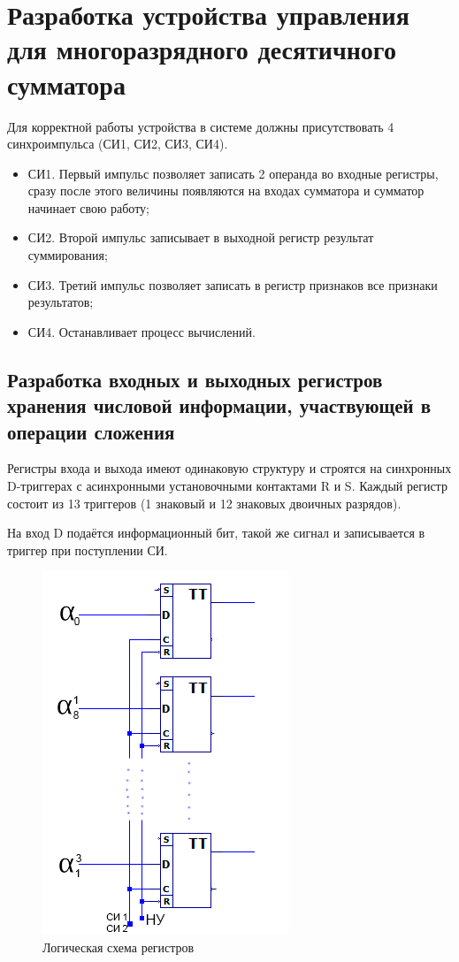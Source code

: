 \documentclass[a4paper,14pt]{article}
\begin{document}
\section{Разработка устройства управления для многоразрядного десятичного сумматора}

Для корректной работы устройства в системе должны присутствовать 4 синхроимпульса (СИ1, СИ2, СИ3, СИ4).

\begin{itemize}
	\item СИ1. Первый импульс позволяет записать 2 операнда во входные регистры, сразу после этого величины появляются на входах сумматора и сумматор начинает свою работу;
	
	\item СИ2. Второй импульс записывает в выходной регистр результат суммирования;
	
	\item СИ3. Третий импульс позволяет записать в регистр признаков все признаки результатов;
	
	\item СИ4. Останавливает процесс вычислений.
\end{itemize} 

\subsection{Разработка входных и выходных регистров хранения числовой информации, участвующей в операции сложения}

Регистры входа и выхода имеют одинаковую структуру и строятся на синхронных D-триггерах с асинхронными установочными контактами R и S.
Каждый регистр состоит из 13 триггеров (1 знаковый и 12 знаковых двоичных разрядов).

На вход D подаётся информационный бит, такой же сигнал и записывается в триггер при поступлении СИ.

\begin{figure}[H]
	\centering
	\includegraphics[width=0.4\linewidth]{images/reg}
	\caption{Логическая схема регистров}
	\label{fig:reg}
\end{figure}
\end{document}
